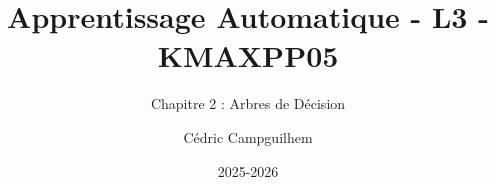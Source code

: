 \documentclass[10pt]{beamer}  %
\title{Apprentissage Automatique - L3 - KMAXPP05}
\subtitle{Chapitre 2 : Arbres de Décision}
\author{Cédric Campguilhem}
\institute[]{
	Airbus Operations \\
	\href{mailto:cedric.campguilhem@airbus.com}{\texttt{cedric.campguilhem@airbus.com}}
}
\date{2025-2026}
\begin{document}
	
	\begin{frame}
		\titlepage
	\end{frame}
	
	
	
	
	
	
	
	
\end{document}
